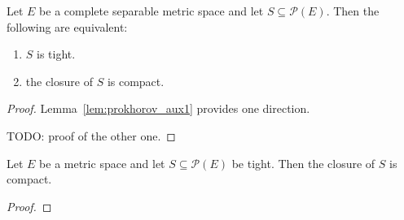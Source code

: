 \begin{theorem}\label{thm:prokhorov}
Let $E$ be a complete separable metric space and let $S \subseteq \mathcal P(E)$. Then the following are equivalent:
\begin{enumerate}
	\item $S$ is tight.
	\item the closure of $S$ is compact.
\end{enumerate}
\end{theorem}

\begin{proof}
Lemma~\ref{lem:prokhorov_aux1} provides one direction.

TODO: proof of the other one.
\end{proof}

\begin{lemma}\label{lem:relatively_compact_of_tight}
Let $E$ be a metric space and let $S \subseteq \mathcal P(E)$ be tight. Then the closure of $S$ is compact.
\end{lemma}

\begin{proof}
\end{proof}
